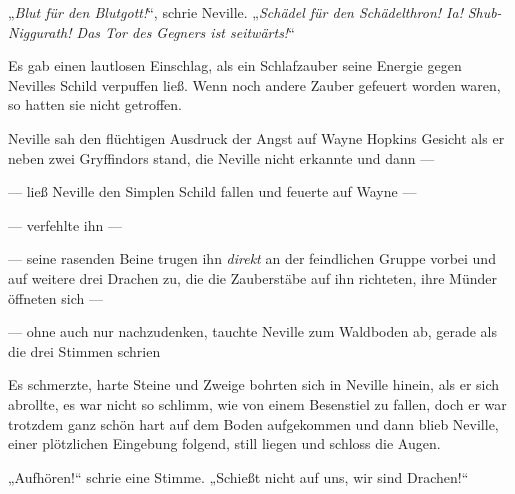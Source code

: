 „\emph{Blut für den Blutgott!}“, schrie Neville.
„\emph{Schädel für den Schädelthron! Ia!} \emph{Shub-Niggurath! Das Tor des Gegners ist seitwärts!}“

Es gab einen lautlosen Einschlag, als ein Schlafzauber seine Energie gegen Nevilles Schild verpuffen ließ. Wenn noch andere Zauber gefeuert worden waren, so hatten sie nicht getroffen.

Neville sah den flüchtigen Ausdruck der Angst auf Wayne Hopkins Gesicht als er neben zwei Gryffindors stand, die Neville nicht erkannte und dann —

— ließ Neville den Simplen Schild fallen und feuerte auf Wayne —

— verfehlte ihn —

— seine rasenden Beine trugen ihn \emph{direkt} an der feindlichen Gruppe vorbei und auf weitere drei Drachen zu, die die Zauberstäbe auf ihn richteten, ihre Münder öffneten sich —

— ohne auch nur nachzudenken, tauchte Neville zum Waldboden ab, gerade als die drei Stimmen schrien 

Es schmerzte, harte Steine und Zweige bohrten sich in Neville hinein, als er sich abrollte, es war nicht so schlimm, wie von einem Besenstiel zu fallen, doch er war trotzdem ganz schön hart auf dem Boden aufgekommen und dann blieb Neville, einer plötzlichen Eingebung folgend, still liegen und schloss die Augen.

„Aufhören!“ schrie eine Stimme.
„Schießt nicht auf uns, wir sind Drachen!“

